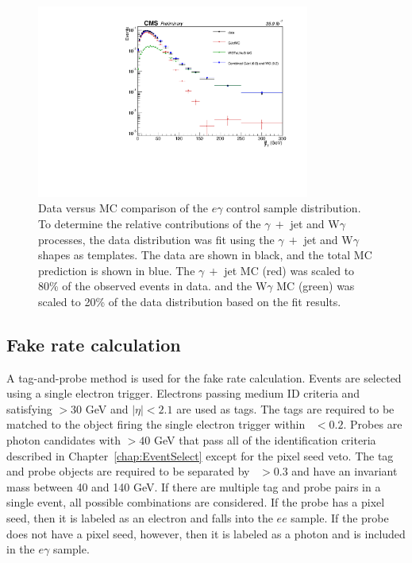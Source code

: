 \begin{figure}[h!]
	\centering
	\includegraphics[width=0.8\textwidth]{Figures/DataAnalysis/dataMC_EG.pdf}
       \caption[Data versus MC comparison of the $e\gamma$ control sample \ETmiss distribution.]
       {Data versus MC comparison of the $e\gamma$ control sample \ETmiss distribution. 
       To determine the relative contributions of the
       $\gamma~+$ jet and W$\gamma$ processes, the data distribution was fit using the $\gamma~+$ jet and W$\gamma$ shapes as templates. The data
       are shown in black, and the total MC prediction is shown in blue. The $\gamma~+$ jet MC (red) was scaled to 80\% of the observed events in data. and 
       the W$\gamma$ MC (green) was scaled to 20\% of the data distribution based on the fit results.
	}
   	\label{fig:dataMCEG}
\end{figure}


\subsection{Fake rate calculation}
\label{sec:fakeRate}

A tag-and-probe method is used for the fake rate calculation. Events are selected using a single electron trigger. Electrons passing medium ID criteria and 
satisfying \pT $> 30$ GeV and $|\eta| < 2.1$ are used as tags. The tags are required to be matched to the object firing the single electron trigger within \dR~$ < 0.2$. 
Probes are photon candidates with \pT $> 40$ GeV that pass all of the identification criteria described in Chapter~\ref{chap:EventSelect} except for the pixel seed veto. The tag and probe objects are required to be separated by \dR~$ > 0.3$ and have an invariant mass between 40 and 140 GeV. If there are multiple tag and probe pairs in a single event, all possible combinations are considered. If the probe has a pixel seed, then it is labeled as an electron and falls into the $ee$ sample. If the probe does not have a pixel seed, however, then it is labeled as a photon and is included in the $e\gamma$ sample. 

